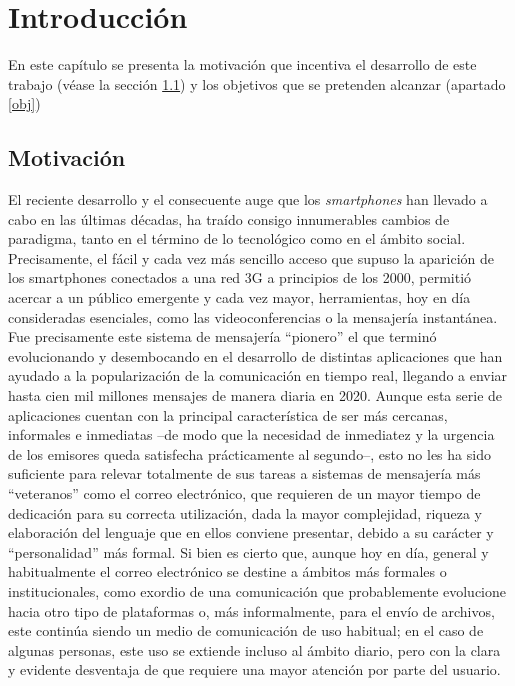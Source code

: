 \chapter{Introducción}
\label{cap:introduccion}



En este capítulo se presenta la motivación que incentiva el desarrollo de este trabajo (véase la sección \ref{motivacion}) y los objetivos que se pretenden alcanzar (apartado \ref{obj})

\section{Motivación}\label{motivacion}
El reciente desarrollo y el consecuente auge que los \textit{smartphones} han llevado a cabo en las últimas décadas, ha traído consigo innumerables cambios de paradigma, tanto en el término de lo tecnológico como en el ámbito social. Precisamente, el fácil y cada vez más sencillo acceso que supuso la aparición de los smartphones conectados a una red 3G a principios de los 2000, permitió acercar a un público emergente y cada vez mayor, herramientas, hoy en día consideradas esenciales, como las videoconferencias o la mensajería instantánea. Fue precisamente este sistema de mensajería ``pionero'' el que terminó evolucionando y desembocando en el desarrollo de distintas aplicaciones que han ayudado a la popularización de la comunicación en tiempo real, llegando a enviar hasta cien mil millones mensajes de manera diaria en 2020. Aunque esta serie de aplicaciones cuentan con la principal característica de ser más cercanas, informales e inmediatas –de modo que la necesidad de inmediatez y la urgencia de los emisores queda satisfecha prácticamente al segundo–, esto no les ha sido suficiente para relevar totalmente de sus tareas a sistemas de mensajería más ``veteranos'' como el correo electrónico, que requieren de un mayor tiempo de dedicación para su correcta utilización, dada la mayor complejidad, riqueza y elaboración del lenguaje que en ellos conviene presentar, debido a su carácter y ``personalidad'' más formal. Si bien es cierto que, aunque hoy en día, general y habitualmente el correo electrónico se destine a ámbitos más formales o institucionales, como exordio de una comunicación que probablemente evolucione hacia otro tipo de plataformas o, más informalmente, para el envío de archivos, este continúa siendo un medio de comunicación de uso habitual; en el caso de algunas personas, este uso se extiende incluso al ámbito diario, pero con la clara y evidente desventaja de que requiere una mayor atención por parte del usuario.

